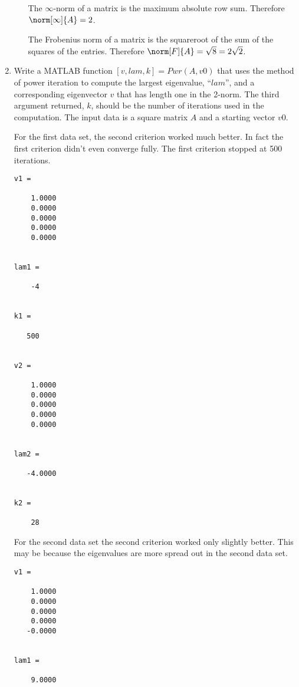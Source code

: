 \documentclass[11pt]{article}
\begin{document}
\begin{enumerate}
\begin{enumerate}
                The $\infty$-norm of a matrix is the maximum absolute row sum.
                Therefore $\norm[\infty]{A} = 2$.

                The Frobenius norm of a matrix is the squareroot of the sum of
                the squares of the entries.
                Therefore $\norm[F]{A} = \sqrt{8} = 2\sqrt{2}$.
        \end{enumerate}

    \item %
        Write a MATLAB function $[v, lam, k] = Pwr(A, v0)$ that uses the method
        of power iteration to compute the largest eigenvalue, ``$lam$'', and a
        corresponding eigenvector $v$ that has length one in the 2-norm.
        The third argument returned, $k$, should be the number of iterations used in
        the computation.
        The input data is a square matrix $A$ and a starting vector $v0$.

        
        
        

        For the first data set, the second criterion worked much better.
        In fact the first criterion didn't even converge fully.
        The first criterion stopped at 500 iterations.
        \begin{verbatim}
v1 =

    1.0000
    0.0000
    0.0000
    0.0000
    0.0000


lam1 =

    -4


k1 =

   500


v2 =

    1.0000
    0.0000
    0.0000
    0.0000
    0.0000


lam2 =

   -4.0000


k2 =

    28
    \end{verbatim}
    For the second data set the second criterion worked only slightly better.
    This may be because the eigenvalues are more spread out in the second
    data set.
    \begin{verbatim}
v1 =

    1.0000
    0.0000
    0.0000
    0.0000
   -0.0000


lam1 =

    9.0000



\end{verbatim}
\end{enumerate}
\end{document}
